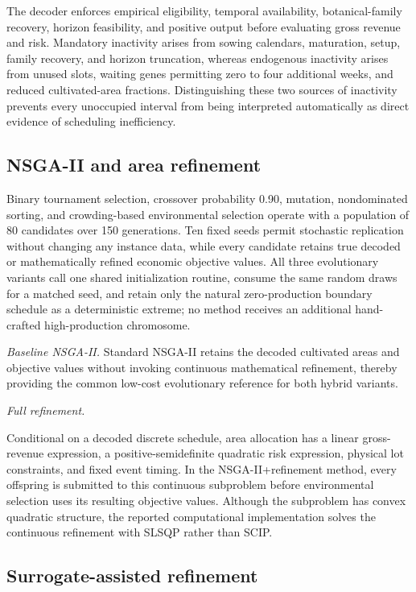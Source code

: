 \documentclass[]{interact}
\begin{document}
The decoder enforces empirical eligibility, temporal availability, botanical-family recovery, horizon feasibility, and positive output before evaluating gross revenue and risk. Mandatory inactivity arises from sowing calendars, maturation, setup, family recovery, and horizon truncation, whereas endogenous inactivity arises from unused slots, waiting genes permitting zero to four additional weeks, and reduced cultivated-area fractions. Distinguishing these two sources of inactivity prevents every unoccupied interval from being interpreted automatically as direct evidence of scheduling inefficiency.

\subsection{NSGA-II and area refinement}

Binary tournament selection, crossover probability 0.90, mutation, nondominated sorting, and crowding-based environmental selection operate with a population of 80 candidates over 150 generations. Ten fixed seeds permit stochastic replication without changing any instance data, while every candidate retains true decoded or mathematically refined economic objective values. All three evolutionary variants call one shared initialization routine, consume the same random draws for a matched seed, and retain only the natural zero-production boundary schedule as a deterministic extreme; no method receives an additional hand-crafted high-production chromosome.

\noindent\textit{Baseline NSGA-II.}
Standard NSGA-II retains the decoded cultivated areas and objective values without invoking continuous mathematical refinement, thereby providing the common low-cost evolutionary reference for both hybrid variants.

\noindent\textit{Full refinement.}

Conditional on a decoded discrete schedule, area allocation has a linear gross-revenue expression, a positive-semidefinite quadratic risk expression, physical lot constraints, and fixed event timing. In the NSGA-II+refinement method, every offspring is submitted to this continuous subproblem before environmental selection uses its resulting objective values. Although the subproblem has convex quadratic structure, the reported computational implementation solves the continuous refinement with SLSQP rather than SCIP.

\subsection{Surrogate-assisted refinement}
\end{document}
